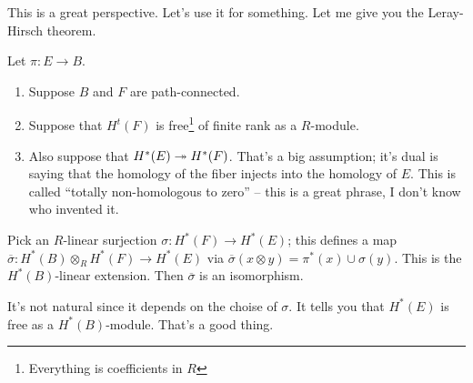This is a great perspective.
Let's use it for something.
Let me give you the Leray-Hirsch theorem.
\begin{theorem}
    Let $\pi:E\to B$.
    \begin{enumerate}
	\item Suppose $B$ and $F$ are path-connected.
	\item Suppose that $H^t(F)$ is free\footnote{Everything is coefficients in $R$} of finite rank as a $R$-module.
	\item Also suppose that $H^\ast(E)\twoheadrightarrow H^\ast(F)$.
    That's a big assumption; it's dual is saying that the homology of the fiber injects into the homology of $E$.
    This is called ``totally non-homologous to zero'' -- this is a great phrase, I don't know who invented it.
    \end{enumerate}
    Pick an $R$-linear surjection $\sigma:H^\ast(F)\to H^\ast(E)$; this defines a map $\overline{\sigma}:H^\ast(B)\otimes_R H^\ast(F)\to H^\ast(E)$ via $\overline{\sigma}(x\otimes y) = \pi^\ast(x)\cup \sigma(y)$.
    This is the $H^\ast(B)$-linear extension.
    Then $\overline{\sigma}$ is an isomorphism.
\end{theorem}
\begin{remark}
    It's not natural since it depends on the choise of $\sigma$.
    It tells you that $H^\ast(E)$ is free as a $H^\ast(B)$-module.
    That's a good thing.
\end{remark}
